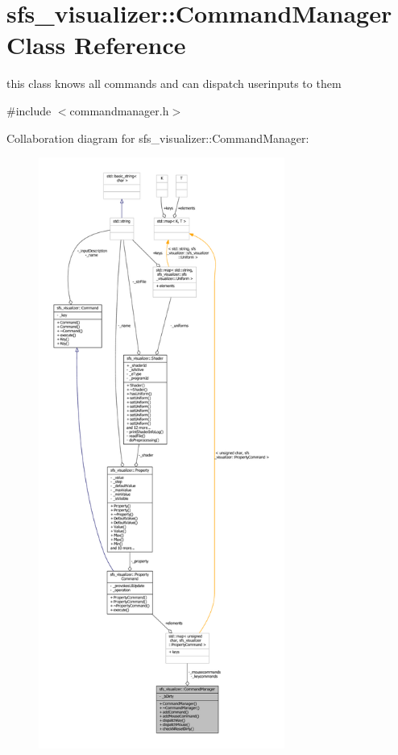 \section{sfs\-\_\-visualizer\-:\-:Command\-Manager Class Reference}
\label{classsfs__visualizer_1_1CommandManager}


this class knows all commands and can dispatch userinputs to them  




{\ttfamily \#include $<$commandmanager.\-h$>$}



Collaboration diagram for sfs\-\_\-visualizer\-:\-:Command\-Manager\-:\nopagebreak
\begin{figure}[H]
\begin{center}
\leavevmode
\includegraphics[height=550pt]{da/d3f/classsfs__visualizer_1_1CommandManager__coll__graph}
\end{center}
\end{figure}
